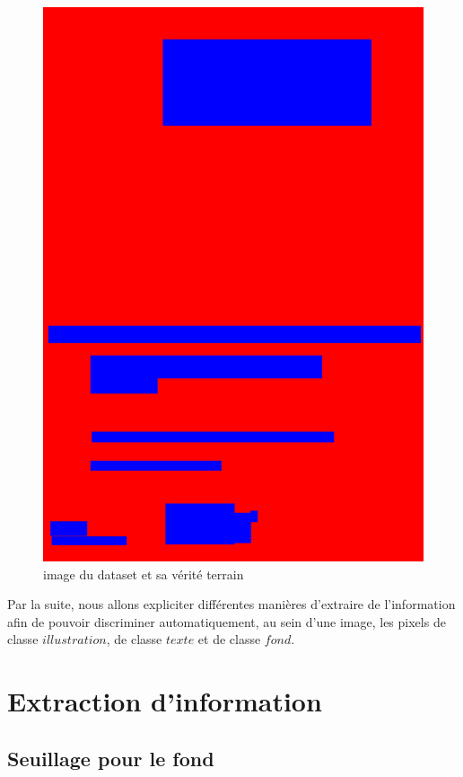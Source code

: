 \documentclass{book}
\begin{document}
\begin{figure}[H]
\begin{center}
\includegraphics[scale=0.2]{images/56_m.jpg}
\end{center}
\caption{image du dataset et sa vérité terrain}
\label{exemple3}
\end{figure}
\clearpage

Par la suite, nous allons expliciter différentes manières d'extraire de l'information afin de pouvoir discriminer automatiquement, au sein d'une image, les pixels de classe
$illustration$, de classe $texte$ et de classe $fond$.

\chapter{Extraction d'information}
\section{Seuillage pour le fond}
\end{document}
